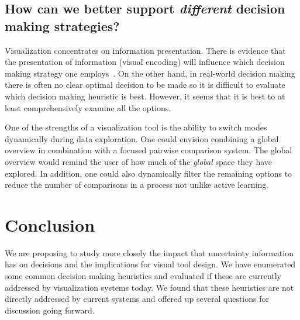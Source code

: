 

\subsection{How can we better support \emph{different} decision making strategies?}

Visualization concentrates on information
presentation.  There is evidence that the presentation of information (visual encoding) will
influence which decision making strategy one employs~\citep{Jarvenpaa:1990}.
On the other hand, in real-world decision making there is often no clear
optimal decision to be made so it is difficult to evaluate which decision
making heuristic is best. However, it seems that it is best to at least
comprehensively examine all the options.

One of the strengths of a visualization tool is the ability to switch modes
dynamically during data exploration. One could envision combining a
global overview in combination with a focused pairwise comparison system.
The global overview would remind the user of how much of the \emph{global}
space they have explored. In addition, one could also dynamically filter
the remaining options to reduce the number of comparisons in a process
not unlike active learning.





\section{Conclusion}

We are proposing to study more closely the impact that uncertainty information
has on decisions and the implications for visual tool design. 
We have enumerated some common decision making heuristics and evaluated
if these are currently addressed by visualization systems today. We found that
these heuristics are not directly addressed by current systems and offered up
several questions for discussion going forward.

